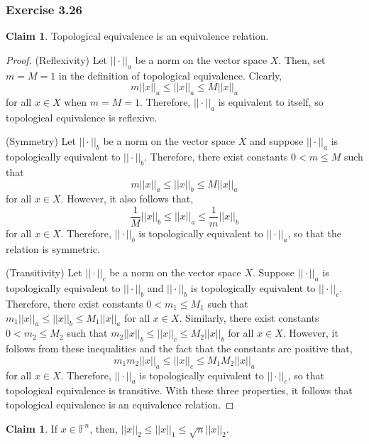 \documentclass[letterpaper,12pt]{article}
\theoremstyle{definition}
\newtheorem{claim}[theorem]{Claim}
\begin{document}
\subsubsection*{Exercise 3.26}
\begin{claim}
	Topological equivalence is an equivalence relation.
\end{claim}
\begin{proof}
	(Reflexivity) Let $||\cdot||_a$ be a norm on the vector space $X$. Then, set $m=M=1$ in the definition of topological equivalence. Clearly,
	\begin{equation}
	m||x||_a \leq ||x||_a \leq M ||x||_a
	\end{equation}
	for all $x \in X$ when $m=M=1$. Therefore, $||\cdot||_a$ is equivalent to itself, so topological equivalence is reflexive.
	
	(Symmetry) Let $||\cdot||_b$ be a norm on the vector space $X$ and suppose $||\cdot||_a$ is topologically equivalent to $||\cdot||_b$. Therefore, there exist constants $0< m \leq M$ such that 
	\begin{equation}
	m||x||_a \leq ||x||_b \leq M ||x||_a
	\end{equation}
	for all $x \in X$. However, it also follows that,
	\begin{equation}
	\frac{1}{M}||x||_b \leq ||x||_a \leq \frac{1}{m} ||x||_b
	\end{equation}
	for all $x \in X$. Therefore, $||\cdot||_b$ is topologically equivalent to $||\cdot||_a$, so that the relation is symmetric.
	
	(Transitivity) Let $||\cdot||_c$ be a norm on the vector space $X$. Suppose $||\cdot||_a$ is topologically equivalent to $||\cdot||_b$ and $||\cdot||_b$ is topologically equivalent to $||\cdot||_c$. Therefore, there exist constants $0< m_1 \leq M_1$ such that $m_1||x||_a \leq ||x||_b \leq M_1 ||x||_a$ for all $x \in X$. Similarly, there exist constants $0< m_2 \leq M_2$ such that $m_2||x||_b \leq ||x||_c \leq M_2 ||x||_b$ for all $x \in X$. However, it follows from these inequalities  and the fact that the constants are positive that,
	\begin{equation}
	m_1 m_2 ||x||_a \leq ||x||_c \leq M_1 M_2 ||x||_a
	\end{equation}
	for all $x \in X$. Therefore, $||\cdot||_a$ is topologically equivalent to $||\cdot||_c$, so that topological equivalence is transitive. With these three properties, it follows that topological equivalence is an equivalence relation.
\end{proof}
\begin{claim}
	If $x\in \mathbb{F}^n$, then, $||x||_2 \leq ||x||_1 \leq \sqrt{n} ||x||_2$.
\end{claim}
\end{document}
